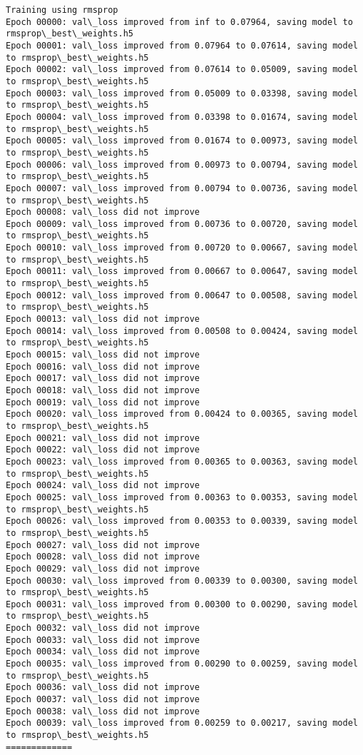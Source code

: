 \documentclass[11pt]{article}
\begin{document}
    \begin{Verbatim}[commandchars=\\\{\}]
Training using rmsprop
Epoch 00000: val\_loss improved from inf to 0.07964, saving model to rmsprop\_best\_weights.h5
Epoch 00001: val\_loss improved from 0.07964 to 0.07614, saving model to rmsprop\_best\_weights.h5
Epoch 00002: val\_loss improved from 0.07614 to 0.05009, saving model to rmsprop\_best\_weights.h5
Epoch 00003: val\_loss improved from 0.05009 to 0.03398, saving model to rmsprop\_best\_weights.h5
Epoch 00004: val\_loss improved from 0.03398 to 0.01674, saving model to rmsprop\_best\_weights.h5
Epoch 00005: val\_loss improved from 0.01674 to 0.00973, saving model to rmsprop\_best\_weights.h5
Epoch 00006: val\_loss improved from 0.00973 to 0.00794, saving model to rmsprop\_best\_weights.h5
Epoch 00007: val\_loss improved from 0.00794 to 0.00736, saving model to rmsprop\_best\_weights.h5
Epoch 00008: val\_loss did not improve
Epoch 00009: val\_loss improved from 0.00736 to 0.00720, saving model to rmsprop\_best\_weights.h5
Epoch 00010: val\_loss improved from 0.00720 to 0.00667, saving model to rmsprop\_best\_weights.h5
Epoch 00011: val\_loss improved from 0.00667 to 0.00647, saving model to rmsprop\_best\_weights.h5
Epoch 00012: val\_loss improved from 0.00647 to 0.00508, saving model to rmsprop\_best\_weights.h5
Epoch 00013: val\_loss did not improve
Epoch 00014: val\_loss improved from 0.00508 to 0.00424, saving model to rmsprop\_best\_weights.h5
Epoch 00015: val\_loss did not improve
Epoch 00016: val\_loss did not improve
Epoch 00017: val\_loss did not improve
Epoch 00018: val\_loss did not improve
Epoch 00019: val\_loss did not improve
Epoch 00020: val\_loss improved from 0.00424 to 0.00365, saving model to rmsprop\_best\_weights.h5
Epoch 00021: val\_loss did not improve
Epoch 00022: val\_loss did not improve
Epoch 00023: val\_loss improved from 0.00365 to 0.00363, saving model to rmsprop\_best\_weights.h5
Epoch 00024: val\_loss did not improve
Epoch 00025: val\_loss improved from 0.00363 to 0.00353, saving model to rmsprop\_best\_weights.h5
Epoch 00026: val\_loss improved from 0.00353 to 0.00339, saving model to rmsprop\_best\_weights.h5
Epoch 00027: val\_loss did not improve
Epoch 00028: val\_loss did not improve
Epoch 00029: val\_loss did not improve
Epoch 00030: val\_loss improved from 0.00339 to 0.00300, saving model to rmsprop\_best\_weights.h5
Epoch 00031: val\_loss improved from 0.00300 to 0.00290, saving model to rmsprop\_best\_weights.h5
Epoch 00032: val\_loss did not improve
Epoch 00033: val\_loss did not improve
Epoch 00034: val\_loss did not improve
Epoch 00035: val\_loss improved from 0.00290 to 0.00259, saving model to rmsprop\_best\_weights.h5
Epoch 00036: val\_loss did not improve
Epoch 00037: val\_loss did not improve
Epoch 00038: val\_loss did not improve
Epoch 00039: val\_loss improved from 0.00259 to 0.00217, saving model to rmsprop\_best\_weights.h5
=============


\end{Verbatim}
\end{document}
